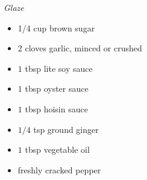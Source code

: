\documentclass{article}
\newcommand{\ingredients}[1][\Large\emph{Ingredients}]{%
    \emph{#1}\\}
\begin{document}
\begin{minipage}{\textwidth}
\begin{multicols*}{2}
\columnbreak
\begin{minipage}{\linewidth}
\ingredients[Glaze]
\begin{itemize}
    \item 1/4 cup brown sugar
    \item 2 cloves garlic, minced or crushed
    \item $1$ tbsp lite soy sauce
    \item $1$ tbsp oyster sauce
    \item $1$ tbsp hoisin sauce
    \item $1/4$ tsp ground ginger
    \item $1$ tbsp vegetable oil
    \item freshly cracked pepper
\end{itemize}
\end{minipage}
\end{multicols*}
\end{minipage}
\vspace{1em}
\end{document}

